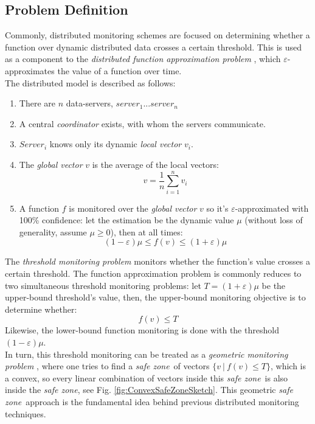 \documentclass[10pt, conference]{IEEEtran}
\newcommand{\safeZone}{\textit{safe zone}}
\begin{document}
\subsection{Problem Definition}
Commonly, distributed monitoring schemes are focused on determining whether a function over dynamic distributed data crosses a certain threshold. This is used as a component to the \textit{distributed function approximation problem} \cite{garofalakis2013sketch}, which $\varepsilon$-approximates the value of a function over time. \\
The distributed model is described as follows:
\begin{enumerate}
\item There are $n$ data-servers, $server_1 ... server_n$
\item A central \textit{coordinator} exists, with whom the servers communicate.
\item $Server_i$ knows only its dynamic \textit{local vector} $v_i$. \\
\item The \textit{global vector} $v$ is the average of the local vectors:
\begin{equation}
v = \frac{1}{n}\sum\limits_{i=1}^n {v_i}
\end{equation}
\item A function $f$ is monitored over the \textit{global vector} $v$ so it's $\varepsilon$-approximated with 100\% confidence: let the estimation be the dynamic value $\mu$ (without loss of generality, assume ${\mu \geq 0}$), then at all times: 
\begin{equation}
(1-\varepsilon )\mu \leq f(v) \leq (1+\varepsilon )\mu
\end{equation}
\end{enumerate}
The \textit{threshold monitoring problem} \cite{garofalakis2013sketch}  monitors whether the function's value crosses a certain threshold. The function approximation problem is commonly reduces to two simultaneous threshold monitoring problems: let ${T = (1+\varepsilon )\mu}$ be the upper-bound threshold's value, then, the upper-bound monitoring objective is to determine whether:
\begin{equation}
f(v) \leq T
\end{equation}
Likewise, the lower-bound function monitoring is done with the threshold ${(1-\varepsilon )\mu}$. \\
In turn, this threshold monitoring can be treated as a \textit{geometric monitoring problem} \cite{sharfman2007geometric}, where one tries to find a \safeZone \ of vectors ${\{v \ | \ f(v) \leq T\}}$, which is a convex, so every linear combination of vectors inside this \safeZone \ is also inside the \safeZone , see Fig. \ref{fig:ConvexSafeZoneSketch}. This geometric \safeZone \ approach is the fundamental idea behind previous distributed monitoring techniques.
\end{document}
